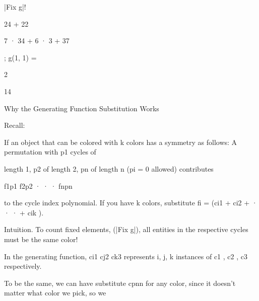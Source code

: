 \documentclass[a4paper,portrait,12pt]{article}
\begin{document}
\begin{flushleft}
|Fix g|!
\end{flushleft}





24 + 22


7 · 34 + 6 · 3 + 37


\begin{flushleft}
; g(1, 1) =
\end{flushleft}


2


14





\begin{flushleft}
Why the Generating Function Substitution Works
\end{flushleft}


\begin{flushleft}
Recall:
\end{flushleft}


\begin{flushleft}
If an object that can be colored with k colors has a symmetry as follows: A permutation with p1 cycles of
\end{flushleft}


\begin{flushleft}
length 1, p2 of length 2, pn of length n (pi = 0 allowed) contributes
\end{flushleft}


\begin{flushleft}
f1p1 f2p2 · · · fnpn
\end{flushleft}


\begin{flushleft}
to the cycle index polynomial. If you have k colors, substitute fi = (ci1 + ci2 + · · · + cik ).
\end{flushleft}


\begin{flushleft}
Intuition. To count fixed elements, (|Fix g|), all entities in the respective cycles must be the same color!
\end{flushleft}


\begin{flushleft}
In the generating function, ci1 cj2 ck3 represents i, j, k instances of c1 , c2 , c3 respectively.
\end{flushleft}


\begin{flushleft}
To be the same, we can have substitute cpnn for any color, since it doesn't matter what color we pick, so we
\end{flushleft}
\end{document}
